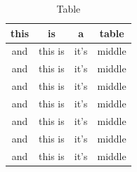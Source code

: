 \documentclass[../../document]{subfiles}
\begin{document}
\begin{table}
	\begin{center}
		\begin{NiceTabular}{cccc}
			\CodeBefore
			\Body
			\toprule
			this & is & a & table \\
			\midrule
			and & this is & it's & middle\\
			and & this is & it's & middle\\
			and & this is & it's & middle\\
			and & this is & it's & middle\\
			and & this is & it's & middle\\
			and & this is & it's & middle\\
			and & this is & it's & middle\\
			\bottomrule
		\end{NiceTabular}
	\end{center}
	\caption{Table}
\end{table}
\end{document}
